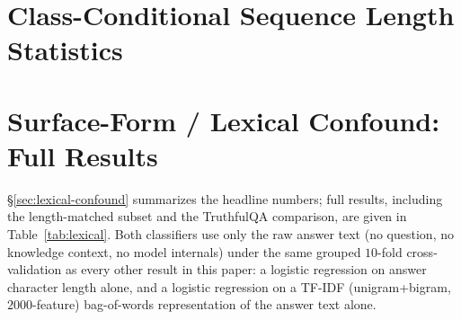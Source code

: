 \documentclass{article}
\begin{document}
\section{Class-Conditional Sequence Length Statistics}
\label{app:lengthstats}
\begin{table}[ht]
\centering
\small
{}
\caption{\textbf{Class-conditional sequence length statistics.} While HaluEval QA exhibits length imbalance ($p = 4 \times 10^{-19}$), TruthfulQA is strictly balanced ($p \ge 0.17$), confirming that the mechanical length-persistence confound is independent of class balance.}
\label{tab:lengthstats}
\end{table}

\section{Surface-Form / Lexical Confound: Full Results}
\label{app:lexical}
\S\ref{sec:lexical-confound} summarizes the headline numbers; full results, including the length-matched subset and the TruthfulQA comparison, are given in Table~\ref{tab:lexical}. Both classifiers use only the raw answer text (no question, no knowledge context, no model internals) under the same grouped $10$-fold cross-validation as every other result in this paper: a logistic regression on answer character length alone, and a logistic regression on a TF-IDF (unigram+bigram, $2000$-feature) bag-of-words representation of the answer text alone.
\end{document}
